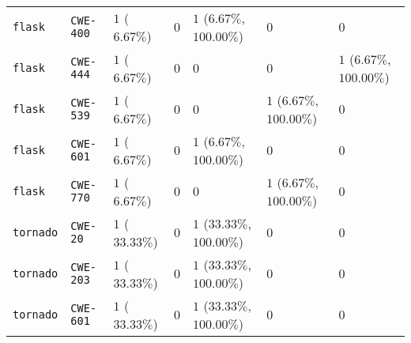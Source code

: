 \begin{table}
\begin{tabular}{lllllll}
\texttt{flask} & \texttt{CWE-400} & $1$ ($6.67\%$) & $0$ & $1$ ($6.67\%$, $100.00\%$) & $0$ & $0$ \\
\texttt{flask} & \texttt{CWE-444} & $1$ ($6.67\%$) & $0$ & $0$ & $0$ & $1$ ($6.67\%$, $100.00\%$) \\
\texttt{flask} & \texttt{CWE-539} & $1$ ($6.67\%$) & $0$ & $0$ & $1$ ($6.67\%$, $100.00\%$) & $0$ \\
\texttt{flask} & \texttt{CWE-601} & $1$ ($6.67\%$) & $0$ & $1$ ($6.67\%$, $100.00\%$) & $0$ & $0$ \\
\texttt{flask} & \texttt{CWE-770} & $1$ ($6.67\%$) & $0$ & $0$ & $1$ ($6.67\%$, $100.00\%$) & $0$ \\
\texttt{tornado} & \texttt{CWE-20} & $1$ ($33.33\%$) & $0$ & $1$ ($33.33\%$, $100.00\%$) & $0$ & $0$ \\
\texttt{tornado} & \texttt{CWE-203} & $1$ ($33.33\%$) & $0$ & $1$ ($33.33\%$, $100.00\%$) & $0$ & $0$ \\
\texttt{tornado} & \texttt{CWE-601} & $1$ ($33.33\%$) & $0$ & $1$ ($33.33\%$, $100.00\%$) & $0$ & $0$ \\
\bottomrule
\end{tabular}
\end{table}
